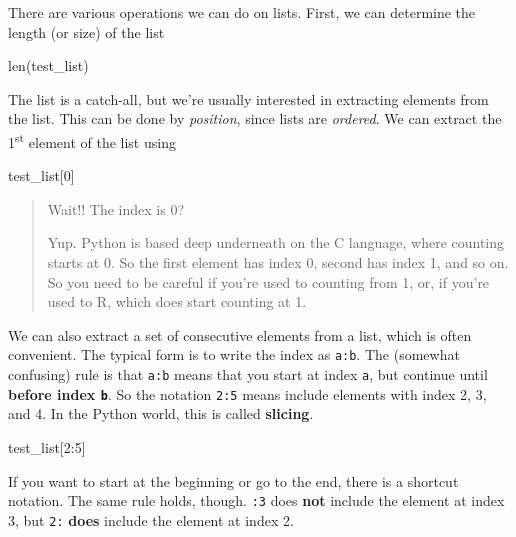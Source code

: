 \documentclass[
  letterpaper,
]{scrbook}
\newenvironment{Shaded}{\begin{snugshade}}{\end{snugshade}}
\newcommand{\BuiltInTok}[1]{#1}
\newcommand{\DecValTok}[1]{\textcolor[rgb]{0.00,0.00,0.81}{#1}}
\newcommand{\NormalTok}[1]{#1}
\begin{document}
There are various operations we can do on lists. First, we can determine the length (or size) of the list

\begin{Shaded}
\begin{Highlighting}[]
\BuiltInTok{len}\NormalTok{(test\_list)}
\end{Highlighting}
\end{Shaded}

The list is a catch-all, but we're usually interested in extracting elements from the list. This can be done by \emph{position}, since lists are \emph{ordered}. We can extract the 1\textsuperscript{st} element of the list using

\begin{Shaded}
\begin{Highlighting}[]
\NormalTok{test\_list[}\DecValTok{0}\NormalTok{]}
\end{Highlighting}
\end{Shaded}

\begin{quote}
Wait!! The index is 0?

Yup. Python is based deep underneath on the C language, where counting starts at 0. So the first element has index 0, second has index 1, and so on. So you need to be careful if you're used to counting from 1, or, if you're used to R, which does start counting at 1.
\end{quote}

We can also extract a set of consecutive elements from a list, which is often convenient. The typical form is to write the index as \texttt{a:b}. The (somewhat confusing) rule is that \texttt{a:b} means that you start at index \texttt{a}, but continue until \textbf{before index \texttt{b}}. So the notation \texttt{2:5} means include elements with index 2, 3, and 4. In the Python world, this is called \textbf{slicing}.

\begin{Shaded}
\begin{Highlighting}[]
\NormalTok{test\_list[}\DecValTok{2}\NormalTok{:}\DecValTok{5}\NormalTok{]}
\end{Highlighting}
\end{Shaded}

If you want to start at the beginning or go to the end, there is a shortcut notation. The same rule holds, though. \texttt{:3} does \textbf{not} include the element at index 3, but \texttt{2:} \textbf{does} include the element at index 2.
\end{document}

